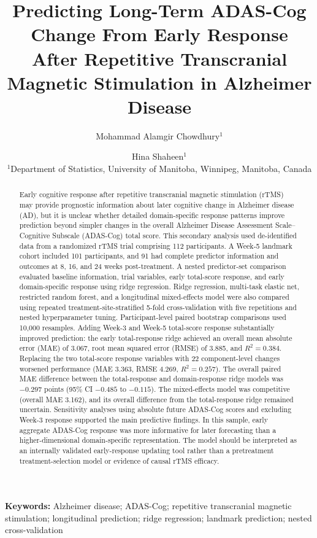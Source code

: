 \documentclass[11pt]{article}
\title{Predicting Long-Term ADAS-Cog Change From Early Response After Repetitive Transcranial Magnetic Stimulation in Alzheimer Disease}
\author{Mohammad Alamgir Chowdhury$^{1}$ \and Hina Shaheen$^{1}$\\
\small $^{1}$Department of Statistics, University of Manitoba, Winnipeg, Manitoba, Canada}
\date{}
\begin{document}
\maketitle

\begin{abstract}
Early cognitive response after repetitive transcranial magnetic stimulation (rTMS) may provide prognostic information about later cognitive change in Alzheimer disease (AD), but it is unclear whether detailed domain-specific response patterns improve prediction beyond simpler changes in the overall Alzheimer Disease Assessment Scale--Cognitive Subscale (ADAS-Cog) total score. This secondary analysis used de-identified data from a randomized rTMS trial comprising 112 participants. A Week-5 landmark cohort included 101 participants, and 91 had complete predictor information and outcomes at 8, 16, and 24 weeks post-treatment. A nested predictor-set comparison evaluated baseline information, trial variables, early total-score response, and early domain-specific response using ridge regression. Ridge regression, multi-task elastic net, restricted random forest, and a longitudinal mixed-effects model were also compared using repeated treatment-site-stratified 5-fold cross-validation with five repetitions and nested hyperparameter tuning. Participant-level paired bootstrap comparisons used 10,000 resamples. Adding Week-3 and Week-5 total-score response substantially improved prediction: the early total-response ridge achieved an overall mean absolute error (MAE) of 3.067, root mean squared error (RMSE) of 3.885, and $R^2=0.384$. Replacing the two total-score response variables with 22 component-level changes worsened performance (MAE 3.363, RMSE 4.269, $R^2=0.257$). The overall paired MAE difference between the total-response and domain-response ridge models was $-0.297$ points (95\% CI $-0.485$ to $-0.115$). The mixed-effects model was competitive (overall MAE 3.162), and its overall difference from the total-response ridge remained uncertain. Sensitivity analyses using absolute future ADAS-Cog scores and excluding Week-3 response supported the main predictive findings. In this sample, early aggregate ADAS-Cog response was more informative for later forecasting than a higher-dimensional domain-specific representation. The model should be interpreted as an internally validated early-response updating tool rather than a pretreatment treatment-selection model or evidence of causal rTMS efficacy.
\end{abstract}

\noindent\textbf{Keywords:} Alzheimer disease; ADAS-Cog; repetitive transcranial magnetic stimulation; longitudinal prediction; ridge regression; landmark prediction; nested cross-validation
\end{document}
